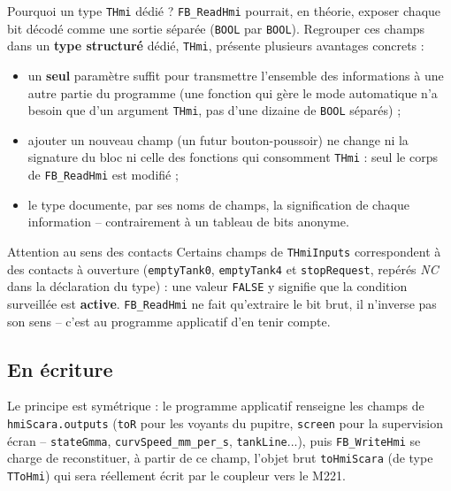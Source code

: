 \begin{UPSTIinfor}{Pourquoi un type \texttt{THmi} dédié ?}
\texttt{FB\_ReadHmi} pourrait, en théorie, exposer chaque bit décodé comme
une sortie séparée (\texttt{BOOL} par \texttt{BOOL}). Regrouper ces champs
dans un \textbf{type structuré} dédié, \texttt{THmi}, présente plusieurs
avantages concrets :
\begin{itemize}
    \item un \textbf{seul} paramètre suffit pour transmettre l'ensemble
    des informations à une autre partie du programme (une fonction qui
    gère le mode automatique n'a besoin que d'un argument \texttt{THmi},
    pas d'une dizaine de \texttt{BOOL} séparés) ;
    \item ajouter un nouveau champ (un futur bouton-poussoir) ne change ni
    la signature du bloc ni celle des fonctions qui consomment
    \texttt{THmi} : seul le corps de \texttt{FB\_ReadHmi} est modifié ;
    \item le type documente, par ses noms de champs, la signification de
    chaque information -- contrairement à un tableau de bits anonyme.
\end{itemize}
\end{UPSTIinfor}

\begin{UPSTIinfor}{Attention au sens des contacts}
Certains champs de \texttt{THmiInputs} correspondent à des contacts à
ouverture (\texttt{emptyTank0}, \texttt{emptyTank4} et
\texttt{stopRequest}, repérés \emph{NC} dans la déclaration du
type) : une valeur \texttt{FALSE} y signifie que la condition surveillée
est \textbf{active}. \texttt{FB\_ReadHmi} ne fait qu'extraire le bit brut,
il n'inverse pas son sens -- c'est au programme applicatif d'en tenir
compte.
\end{UPSTIinfor}

\subsection{En écriture}

Le principe est symétrique : le programme applicatif renseigne les champs
de \texttt{hmiScara.outputs} (\texttt{toR} pour les voyants du
pupitre, \texttt{screen} pour la supervision écran --
\texttt{stateGmma}, \texttt{curvSpeed\_mm\_per\_s},
\texttt{tankLine}...), puis \texttt{FB\_WriteHmi} se charge de
reconstituer, à partir de ce champ, l'objet brut \texttt{toHmiScara} (de
type \texttt{TToHmi}) qui sera réellement écrit par le coupleur vers le
M221.

